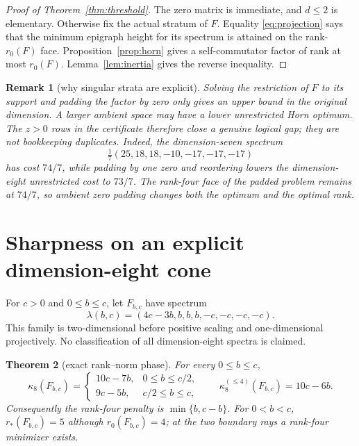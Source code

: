 \documentclass[11pt]{article}
\newtheorem{theorem}{Theorem}[section]
\newtheorem{remark}[theorem]{Remark}
\begin{document}
\begin{proof}[Proof of Theorem~\ref{thm:threshold}]
The zero matrix is immediate, and $d\le2$ is elementary.  Otherwise fix the
actual stratum of $F$.  Equality \eqref{eq:projection} says that the minimum
epigraph height for its spectrum is attained on the rank-$r_0(F)$ face.
Proposition~\ref{prop:horn} gives a self-commutator factor of rank at most
$r_0(F)$.  Lemma~\ref{lem:inertia} gives the reverse inequality.
\end{proof}

\begin{remark}[why singular strata are explicit]
Solving the restriction of $F$ to its support and padding the factor by zero
only gives an upper bound in the original dimension.  A larger ambient space
may have a lower unrestricted Horn optimum.  The $z>0$ rows in the certificate
therefore close a genuine logical gap; they are not bookkeeping duplicates.
Indeed, the dimension-seven spectrum
\[
 \tfrac17(25,18,18,-10,-17,-17,-17)
\]
has cost $74/7$, while padding by one zero and reordering lowers the
dimension-eight unrestricted cost to $73/7$.  The rank-four face of the padded
problem remains at $74/7$, so ambient zero padding changes both the optimum
and the optimal rank.
\end{remark}

\section{Sharpness on an explicit dimension-eight cone}

For $c>0$ and $0\le b\le c$, let $F_{b,c}$ have spectrum
\begin{equation}
\lambda(b,c)=(4c-3b,b,b,b,-c,-c,-c,-c).
\label{eq:family}
\end{equation}
This family is two-dimensional before positive scaling and one-dimensional
projectively.  No classification of all dimension-eight spectra is claimed.

\begin{theorem}[exact rank--norm phase]\label{thm:phase}
For every $0\le b\le c$,
\begin{equation}
 \kappa_8(F_{b,c})=
 \begin{cases}
  10c-7b,&0\le b\le c/2,\\
  9c-5b,&c/2\le b\le c,
 \end{cases}
 \qquad
 \kappa_8^{(\le4)}(F_{b,c})=10c-6b.
 \label{eq:phase}
\end{equation}
Consequently the rank-four penalty is $\min\{b,c-b\}$.  For $0<b<c$,
$r_*(F_{b,c})=5$ although $r_0(F_{b,c})=4$; at the two boundary rays a
rank-four minimizer exists.
\end{theorem}
\end{document}
